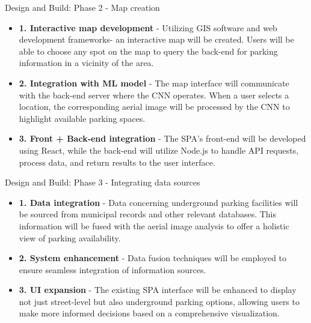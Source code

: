 \documentclass{beamer}
\begin{document}
\begin{frame}{Design and Build: Phase 2 - Map creation}
    \begin{itemize}
        \item{\textbf{1. Interactive map development} - } Utilizing GIS software and web development frameworks- an interactive map will be created. Users will be able to choose any spot on the map to query the back-end for parking information in a vicinity of the area.
        \item{\textbf{2. Integration with ML model} - } The map interface will communicate with the back-end server where the CNN operates. When a user selects a location, the corresponding aerial image will be processed by the CNN to highlight available parking spaces.
        \item{\textbf{3. Front + Back-end integration} - }The SPA’s front-end will be developed using React, while the back-end will utilize Node.js to handle API requests, process data, and return results to the user interface.
    \end{itemize}
\end{frame}

\begin{frame}{Design and Build: Phase 3 - Integrating data sources}
    \begin{itemize}
        \item{\textbf{1. Data integration} - }Data concerning underground parking facilities will be sourced from municipal records and other relevant databases. This information will be fused with the aerial image analysis to offer a holistic view of parking availability.
        \item{\textbf{2. System enhancement} - }Data fusion techniques will be employed to ensure seamless integration of information sources.
        \item{\textbf{3. UI expansion} - }The existing SPA interface will be enhanced to display not just street-level but also underground parking options, allowing users to make more informed decisions based on a comprehensive visualization.
    \end{itemize}
\end{frame}
\end{document}
